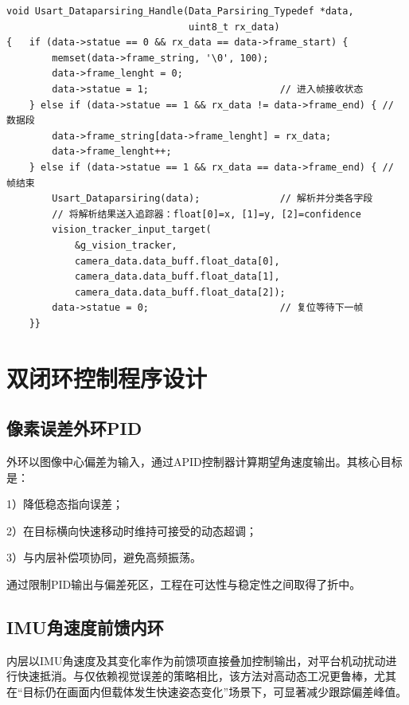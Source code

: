 \begin{lstlisting}[style=cstyle, caption={串口协议帧解析状态机（usart\_dataparsing.c）}, label=code:uart-parser]
void Usart_Dataparsiring_Handle(Data_Parsiring_Typedef *data,
                                uint8_t rx_data)
{   if (data->statue == 0 && rx_data == data->frame_start) {
        memset(data->frame_string, '\0', 100);
        data->frame_lenght = 0;
        data->statue = 1;                       // 进入帧接收状态
    } else if (data->statue == 1 && rx_data != data->frame_end) { // 数据段
        data->frame_string[data->frame_lenght] = rx_data;
        data->frame_lenght++;
    } else if (data->statue == 1 && rx_data == data->frame_end) { // 帧结束
        Usart_Dataparsiring(data);              // 解析并分类各字段
        // 将解析结果送入追踪器：float[0]=x, [1]=y, [2]=confidence
        vision_tracker_input_target(
            &g_vision_tracker,
            camera_data.data_buff.float_data[0],
            camera_data.data_buff.float_data[1],
            camera_data.data_buff.float_data[2]);
        data->statue = 0;                       // 复位等待下一帧
    }}
\end{lstlisting}

\section{双闭环控制程序设计}

\subsection{像素误差外环PID}

外环以图像中心偏差为输入，通过APID控制器计算期望角速度输出。其核心目标是：

1）降低稳态指向误差；

2）在目标横向快速移动时维持可接受的动态超调；

3）与内层补偿项协同，避免高频振荡。

通过限制PID输出与偏差死区，工程在可达性与稳定性之间取得了折中。

\subsection{IMU角速度前馈内环}

内层以IMU角速度及其变化率作为前馈项直接叠加控制输出，对平台机动扰动进行快速抵消。与仅依赖视觉误差的策略相比，该方法对高动态工况更鲁棒，尤其在“目标仍在画面内但载体发生快速姿态变化”场景下，可显著减少跟踪偏差峰值。

